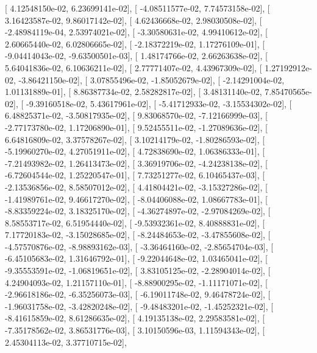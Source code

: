 \documentclass{article}
\begin{document}
       [  4.12548150e-02,   6.23699141e-02],
       [ -4.08511577e-02,   7.74573158e-02],
       [  3.16423587e-02,   9.86017142e-02],
       [  4.62436668e-02,   2.98030508e-02],
       [ -2.48984119e-04,   2.53974021e-02],
       [ -3.30580631e-02,   4.99410612e-02],
       [  2.60665440e-02,   6.02806665e-02],
       [ -2.18372219e-02,   1.17276109e-01],
       [ -9.04414043e-02,  -9.63500501e-03],
       [  1.48174766e-02,   2.66263638e-02],
       [  5.64041836e-02,   6.10636211e-02],
       [  2.77771407e-02,   4.43967309e-02],
       [  1.27192912e-02,  -3.86421150e-02],
       [  3.07855496e-02,  -1.85052679e-02],
       [ -2.14291004e-02,   1.01131889e-01],
       [  8.86387734e-02,   2.58282817e-02],
       [  3.48131140e-02,   7.85470565e-02],
       [ -9.39160518e-02,   5.43617961e-02],
       [ -5.41712933e-02,  -3.15534302e-02],
       [  6.48825371e-02,  -3.50817935e-02],
       [  9.83068570e-02,  -7.12166999e-03],
       [ -2.77173780e-02,   1.17206890e-01],
       [  9.52455511e-02,  -1.27089636e-02],
       [  6.64816809e-02,   3.37578267e-02],
       [  3.10214179e-02,  -1.80286593e-02],
       [ -5.19960270e-02,   4.27051911e-02],
       [  4.72838690e-02,   1.06386333e-01],
       [ -7.21493982e-02,   1.26413473e-02],
       [  3.36919706e-02,  -4.24238138e-02],
       [ -6.72604544e-02,   1.25220547e-01],
       [  7.73251277e-02,   6.10465437e-03],
       [ -2.13536856e-02,   8.58507012e-02],
       [  4.41804421e-02,  -3.15327286e-02],
       [ -1.41989761e-02,   9.46617270e-02],
       [ -8.04406088e-02,   1.08667783e-01],
       [ -8.83359224e-02,   3.18325170e-02],
       [ -4.36274897e-02,  -2.97084269e-02],
       [  8.58553717e-02,   6.51954440e-02],
       [ -9.53932361e-02,   8.40888831e-02],
       [  7.17720183e-02,  -3.15028685e-02],
       [ -8.24484653e-02,  -3.47855608e-02],
       [ -4.57570876e-02,  -8.98893162e-03],
       [ -3.36464160e-02,  -2.85654704e-03],
       [ -6.45105683e-02,   1.31646792e-01],
       [ -9.22044648e-02,   1.03465041e-02],
       [ -9.35553591e-02,  -1.06819651e-02],
       [  3.83105125e-02,  -2.28904014e-02],
       [  4.24904093e-02,   1.21157110e-01],
       [ -8.88900295e-02,  -1.11171071e-02],
       [ -2.96618186e-02,  -6.35256073e-03],
       [ -6.19011748e-02,   9.46478724e-02],
       [ -1.96031758e-02,  -3.42820248e-02],
       [ -9.48483201e-02,  -1.45252321e-02],
       [ -8.41615859e-02,   8.61286635e-02],
       [  4.19135138e-02,   2.29583581e-02],
       [ -7.35178562e-02,   3.86531776e-03],
       [  3.10150596e-03,   1.11594343e-02],
       [  2.45304113e-02,   3.37710715e-02],
\end{document}
